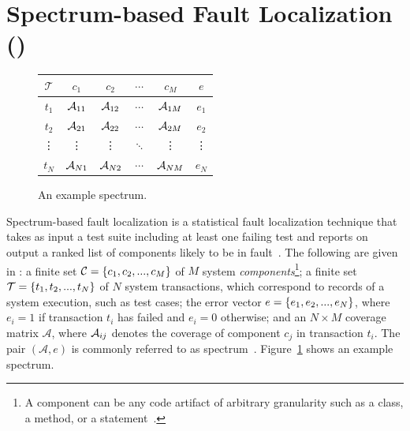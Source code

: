 \documentclass{article}
\begin{document}
\section{Spectrum-based Fault Localization (\sfl)}
\label{sec:sfl}

\begin{figure}
  \hspace{-2ex}
  \centering
  \scriptsize
  \setlength{\tabcolsep}{3.5pt}
  \begin{tabular}{c|cccc|c}
    $\mathcal{T}$ & $c_1$    & $c_2$    & $\cdots$ & $c_M$    & $e$    \\ \hline
    $t_1$         & $\mathcal{A}_{11}$ & $\mathcal{A}_{12}$ & $\cdots$ & $\mathcal{A}_{1M}$ & $e_1$  \\
    $t_2$         & $\mathcal{A}_{21}$ & $\mathcal{A}_{22}$ & $\cdots$ & $\mathcal{A}_{2M}$ & $e_2$  \\
    \vdots        & \vdots   & \vdots   & $\ddots$ & \vdots   & \vdots \\
    $t_N$         & $\mathcal{A}_{N1}$ & $\mathcal{A}_{N2}$ & $\cdots$ & $\mathcal{A}_{NM}$ & $e_N$  \\
  \end{tabular}
  \caption{An example spectrum.}
  \label{fig:spectrum-example}
\end{figure}

Spectrum-based fault localization is a statistical fault
localization technique that takes as input a test suite including at
least one failing test and reports on output a ranked list of
components likely to be in
fault~\cite{7390282,DBLP:conf/kbse/JonesH05,DBLP:journals/smr/LuciaLJTB14,DBLP:journals/jss/AbreuZGG09}. The
following are given in \sfl{}: a finite set $\mathcal{C}=\{{}c_1,c_2,...,c_M\}$
of $M$ system \emph{components}\footnote{A
component can be any code artifact of arbitrary granularity
such as a class, a method, or a statement~\cite{DBLP:journals/stvr/HarroldRSWY00}.};
a finite set $\mathcal{T} = \{{}t_1,t_2,...,t_N\}$ of $N$ system transactions,
which correspond to records of a system execution, such as test cases;
the error vector $e = \{{}e_1,e_2,...,e_N\}$, where $e_i = 1$ if
transaction $t_i$ has failed and $e_i = 0$ otherwise; and an
$N\times{}M$ coverage matrix $\mathcal{A}$, where $\mathcal{A}_{ij}$ denotes the
coverage of component $c_j$ in transaction $t_i$.  The pair
$(\mathcal{A},e)$ is commonly referred to as
spectrum~\cite{DBLP:journals/stvr/HarroldRSWY00}. Figure~\ref{fig:spectrum-example}
shows an example spectrum.
\end{document}
